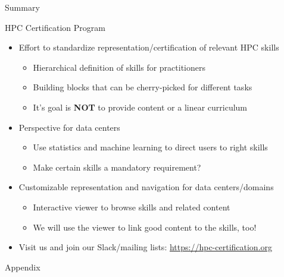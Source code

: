 \documentclass[compress,aspectratio=169]{beamer}
\begin{document}
\begin{frame}{Summary}

	\begin{block}{HPC Certification Program}
		\begin{itemize}
			\item Effort to standardize representation/certification of relevant HPC skills
      \begin{itemize}
        \item Hierarchical definition of skills for practitioners
        \item Building blocks that can be cherry-picked for different tasks
				\item It's goal is \textbf{NOT} to provide content or a linear curriculum
      \end{itemize}
			\item Perspective for data centers
				\begin{itemize}
					\item Use statistics and machine learning to direct users to right skills
					\item Make certain skills a mandatory requirement?
				\end{itemize}
			\item Customizable representation and navigation for data centers/domains
      \begin{itemize}
        \item Interactive viewer to browse skills and related content
				\item We will use the viewer to link good content to the skills, too!
      \end{itemize}
      \item Visit us and join our Slack/mailing lists: \url{https://hpc-certification.org}
		\end{itemize}
	\end{block}
  \label{pg:lastpage}
\end{frame}

\appendix 

\begin{frame}{Appendix}
\end{frame}
\end{document}
